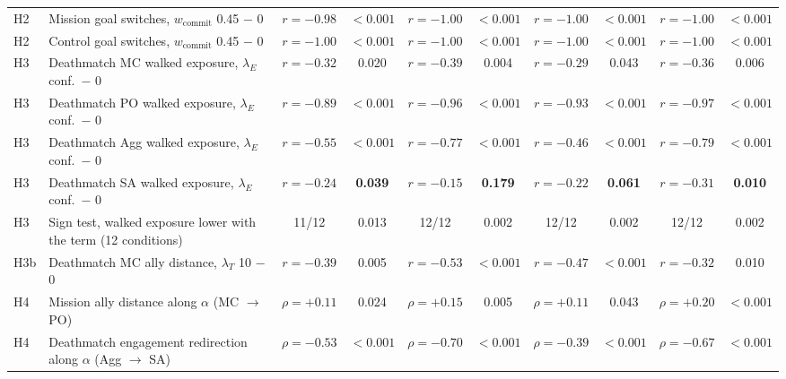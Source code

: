 \begin{tabular}{llcccccccc}
H2 & Mission goal switches, $w_{\mathrm{commit}}$ 0.45 $-$ 0 & $r=-0.98$ & $<0.001$ & $r=-1.00$ & $<0.001$ & $r=-1.00$ & $<0.001$ & $r=-1.00$ & $<0.001$ \\
H2 & Control goal switches, $w_{\mathrm{commit}}$ 0.45 $-$ 0 & $r=-1.00$ & $<0.001$ & $r=-1.00$ & $<0.001$ & $r=-1.00$ & $<0.001$ & $r=-1.00$ & $<0.001$ \\
H3 & Deathmatch MC walked exposure, $\lambda_E$ conf.\ $-$ 0 & $r=-0.32$ & 0.020 & $r=-0.39$ & 0.004 & $r=-0.29$ & 0.043 & $r=-0.36$ & 0.006 \\
H3 & Deathmatch PO walked exposure, $\lambda_E$ conf.\ $-$ 0 & $r=-0.89$ & $<0.001$ & $r=-0.96$ & $<0.001$ & $r=-0.93$ & $<0.001$ & $r=-0.97$ & $<0.001$ \\
H3 & Deathmatch Agg walked exposure, $\lambda_E$ conf.\ $-$ 0 & $r=-0.55$ & $<0.001$ & $r=-0.77$ & $<0.001$ & $r=-0.46$ & $<0.001$ & $r=-0.79$ & $<0.001$ \\
H3 & Deathmatch SA walked exposure, $\lambda_E$ conf.\ $-$ 0 & $r=-0.24$ & \textbf{0.039} & $r=-0.15$ & \textbf{0.179} & $r=-0.22$ & \textbf{0.061} & $r=-0.31$ & \textbf{0.010} \\
H3 & Sign test, walked exposure lower with the term (12 conditions) & 11/12 & 0.013 & 12/12 & 0.002 & 12/12 & 0.002 & 12/12 & 0.002 \\
H3b & Deathmatch MC ally distance, $\lambda_T$ 10 $-$ 0 & $r=-0.39$ & 0.005 & $r=-0.53$ & $<0.001$ & $r=-0.47$ & $<0.001$ & $r=-0.32$ & 0.010 \\
H4 & Mission ally distance along $\alpha$ (MC $\to$ PO) & $\rho=+0.11$ & 0.024 & $\rho=+0.15$ & 0.005 & $\rho=+0.11$ & 0.043 & $\rho=+0.20$ & $<0.001$ \\
H4 & Deathmatch engagement redirection along $\alpha$ (Agg $\to$ SA) & $\rho=-0.53$ & $<0.001$ & $\rho=-0.70$ & $<0.001$ & $\rho=-0.39$ & $<0.001$ & $\rho=-0.67$ & $<0.001$ \\
\bottomrule
\end{tabular}

